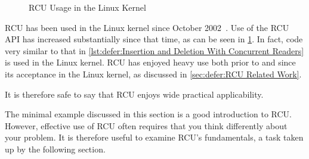 \begin{figure}
\centering
{}
\caption{RCU Usage in the Linux Kernel}
\label{fig:defer:RCU Usage in the Linux Kernel}
\end{figure}

RCU has been used in the Linux kernel since
October 2002~\cite{Torvalds2.5.43}.
Use of the RCU API has increased substantially since that time,
as can be seen in
\cref{fig:defer:RCU Usage in the Linux Kernel}.
In fact, code very similar to that in
\cref{lst:defer:Insertion and Deletion With Concurrent Readers}
is used in the Linux kernel.
RCU has enjoyed heavy use both prior to and since its acceptance
in the Linux kernel, as discussed in
\cref{sec:defer:RCU Related Work}.

It is therefore safe to say that RCU enjoys wide practical applicability.

The minimal example discussed in this section is a good introduction to RCU\@.
However, effective use of RCU often requires that you think differently
about your problem.
It is therefore useful to examine RCU's fundamentals, a task taken up
by the following section.
